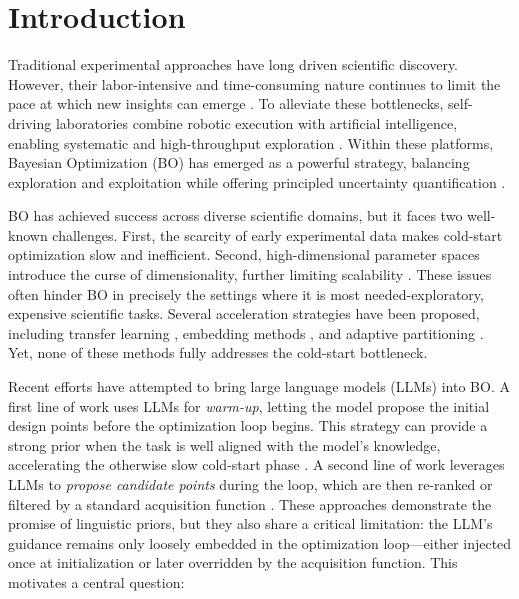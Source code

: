 \documentclass{article} %
\begin{document}
\section{Introduction}
Traditional experimental approaches have long driven scientific discovery. However, their labor-intensive and time-consuming nature continues to limit the pace at which new insights can emerge \citep{Xie2023autonomous,Tom2024selfdriving,Seifrid2022sdl}. To alleviate these bottlenecks, self-driving laboratories combine robotic execution with artificial intelligence, enabling systematic and high-throughput exploration \citep{Chen2024array,Ai2024gas}. Within these platforms, Bayesian Optimization (BO) has emerged as a powerful strategy, balancing exploration and exploitation while offering principled uncertainty quantification \citep{Guo2023BOchem,Shields2021reactionopt,Shahriari2015BOreview}.

BO has achieved success across diverse scientific domains, but it faces two well-known challenges. First, the scarcity of early experimental data makes cold-start optimization slow and inefficient. Second, high-dimensional parameter spaces introduce the curse of dimensionality, further limiting scalability \citep{Guo2023BOchem}. These issues often hinder BO in precisely the settings where it is most needed-exploratory, expensive scientific tasks. Several acceleration strategies have been proposed, including transfer learning \citep{Swersky2013multitask}, embedding methods \citep{Nayebi2019subspaces,Moriconi2020lowdim}, and adaptive partitioning \citep{Wang2020lamcts}. Yet, none of these methods fully addresses the cold-start bottleneck.

Recent efforts have attempted to bring large language models (LLMs) into BO. A first line of work uses LLMs for \emph{warm-up}, letting the model propose the initial design points before the optimization loop begins. This strategy can provide a strong prior when the task is well aligned with the model’s knowledge, accelerating the otherwise slow cold-start phase \citep{liularge}. A second line of work leverages LLMs to \emph{propose candidate points} during the loop, which are then re-ranked or filtered by a standard acquisition function \citep{LLINBO,ADO-LLM,ReasoningBO}. These approaches demonstrate the promise of linguistic priors, but they also share a critical limitation: the LLM's guidance remains only loosely embedded in the optimization loop—either injected once at initialization or later overridden by the acquisition function. This motivates a central question:
\end{document}
